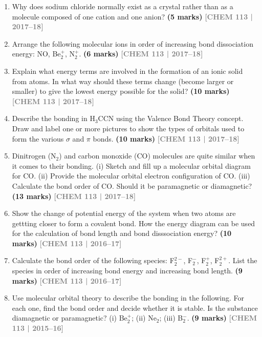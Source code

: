 \documentclass[12pt,a3paper]{article}
\newcommand{\yr}[1]{\hfill\textcolor{gray}{\small\textbf{[#1]}}}
\newcommand{\mk}[1]{\textcolor{orange!70!black}{\small\textbf{(#1 marks)}}}
\begin{document}
\begin{enumerate}
\item Why does sodium chloride normally exist as a crystal rather than as a molecule composed of one cation and one anion? \mk{5}
\yr{CHEM 113 | 2017--18}



\item Arrange the following molecular ions in order of increasing bond dissociation energy: NO, Be$_2^+$, N$_2^+$. \mk{6}
\yr{CHEM 113 | 2017--18}



\item Explain what energy terms are involved in the formation of an ionic solid from atoms. In what way should these terms change (become larger or smaller) to give the lowest energy possible for the solid? \mk{10}
\yr{CHEM 113 | 2017--18}



\item Describe the bonding in H$_3$CCN using the Valence Bond Theory concept. Draw and label one or more pictures to show the types of orbitals used to form the various $\sigma$ and $\pi$ bonds. \mk{10}
\yr{CHEM 113 | 2017--18}



\item Dinitrogen (N$_2$) and carbon monoxide (CO) molecules are quite similar when it comes to their bonding. (i) Sketch and fill up a molecular orbital diagram for CO. (ii) Provide the molecular orbital electron configuration of CO. (iii) Calculate the bond order of CO. Should it be paramagnetic or diamagnetic? \mk{13}
\yr{CHEM 113 | 2017--18}



\item Show the change of potential energy of the system when two atoms are gettting closer to form a covalent bond. How the energy diagram can be used for the calculation of bond length and bond disssociation energy? \mk{10}
\yr{CHEM 113 | 2016--17}



\item Calculate the bond order of the following species: F$_2^{2-}$, F$_2^-$, F$_2^+$, F$_2^{2+}$. List the species in order of increasing bond energy and increasing bond length. \mk{9}
\yr{CHEM 113 | 2016--17}



\item Use molecular orbital theory to describe the bonding in the following. For each one, find the bond order and decide whether it is stable. Is the substance diamagnetic or paramagnetic? (i) Be$_2^+$; (ii) Ne$_2$; (iii) B$_2^-$. \mk{9}
\yr{CHEM 113 | 2015--16}




\end{enumerate}
\end{document}
